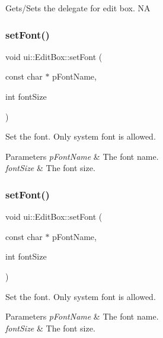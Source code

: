 Gets/\+Sets the delegate for edit box.  NA \mbox{\label{classui_1_1EditBox_a08931a6b6fde6d4e4365204beb3af43d}} 
\subsubsection{\texorpdfstring{set\+Font()}{setFont()}\hspace{0.1cm}{\footnotesize\ttfamily [1/2]}}
{\footnotesize\ttfamily void ui\+::\+Edit\+Box\+::set\+Font (\begin{DoxyParamCaption}\item[{const char $\ast$}]{p\+Font\+Name,  }\item[{int}]{font\+Size }\end{DoxyParamCaption})}

Set the font. Only system font is allowed. 
\begin{DoxyParams}{Parameters}
{\em p\+Font\+Name} & The font name. \\
\hline
{\em font\+Size} & The font size. \\
\hline
\end{DoxyParams}
\mbox{\label{classui_1_1EditBox_a08931a6b6fde6d4e4365204beb3af43d}} 
\subsubsection{\texorpdfstring{set\+Font()}{setFont()}\hspace{0.1cm}{\footnotesize\ttfamily [2/2]}}
{\footnotesize\ttfamily void ui\+::\+Edit\+Box\+::set\+Font (\begin{DoxyParamCaption}\item[{const char $\ast$}]{p\+Font\+Name,  }\item[{int}]{font\+Size }\end{DoxyParamCaption})}

Set the font. Only system font is allowed. 
\begin{DoxyParams}{Parameters}
{\em p\+Font\+Name} & The font name. \\
\hline
{\em font\+Size} & The font size. \\
\hline
\end{DoxyParams}
\mbox{\label{classui_1_1EditBox_a5dd7dcc5252cdb08ef9f0a15238df0dd}} 
